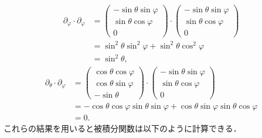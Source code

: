\documentclass{ltjsbook}
\begin{document}
\begin{align*}
    \partial_\varphi \cdot \partial_\varphi
    &=
    \begin{pmatrix}
        - \sin \theta \sin \varphi \\
        \sin \theta \cos \varphi \\
        0
    \end{pmatrix}
    \cdot
    \begin{pmatrix}
        - \sin \theta \sin \varphi \\
        \sin \theta \cos \varphi \\
        0
    \end{pmatrix} \\
    &= \sin^2 \theta \sin^2 \varphi + \sin^2 \theta \cos^2 \varphi \\
    &= \sin^2 \theta,
\end{align*}
\begin{align*}
    \partial_\theta \cdot \partial_\varphi
    &=
    \begin{pmatrix}
        \cos \theta \cos \varphi \\
        \cos \theta \sin \varphi \\
        - \sin \theta
    \end{pmatrix}
    \cdot
    \begin{pmatrix}
        - \sin \theta \sin \varphi \\
        \sin \theta \cos \varphi \\
        0
    \end{pmatrix} \\
    &= - \cos \theta \cos \varphi \sin \theta \sin \varphi
       + \cos \theta \sin \varphi \sin \theta \cos \varphi \\
    &= 0.
\end{align*}
これらの結果を用いると被積分関数は以下のように計算できる．
\end{document}
